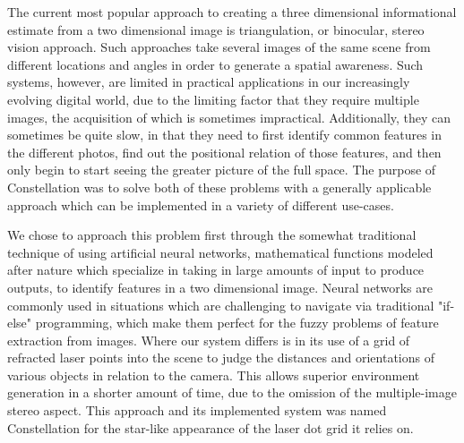 The current most popular approach to creating a three dimensional informational estimate from a two dimensional image is triangulation, or binocular, stereo vision approach. Such approaches take several images of the same scene from different locations and angles in order to generate a spatial awareness. Such systems, however, are limited in practical applications in our increasingly evolving digital world, due to the limiting factor that they require multiple images, the acquisition of which is sometimes impractical. Additionally, they can sometimes be quite slow, in that they need to first identify common features in the different photos, find out the positional relation of those features, and then only begin to start seeing the greater picture of the full space. The purpose of Constellation was to solve both of these problems with a generally applicable approach which can be implemented in a variety of different use-cases.

We chose to approach this problem first through the somewhat traditional technique of using artificial neural networks, mathematical functions modeled after nature which specialize in taking in large amounts of input to produce outputs, to identify features in a two dimensional image. Neural networks are commonly used in situations which are challenging to navigate via traditional "if-else" programming, which make them perfect for the fuzzy problems of feature extraction from images. Where our system differs is in its use of a grid of refracted laser points into the scene to judge the distances and orientations of various objects in relation to the camera. This allows superior environment generation in a shorter amount of time, due to the omission of the multiple-image stereo aspect. This approach and its implemented system was named Constellation for the star-like appearance of the laser dot grid it relies on.